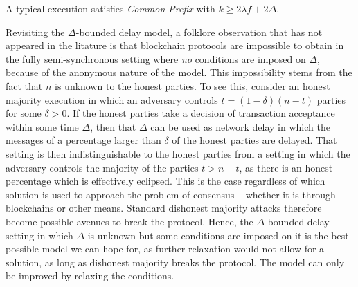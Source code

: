 \begin{theorem}
  A typical execution satisfies \emph{Common Prefix} with
  $k \geq 2\lambda f + 2\Delta$.
\end{theorem}

\begin{remark}
Revisiting the $\Delta$-bounded delay model, a folklore observation that has not appeared in
the litature is that blockchain protocols are impossible to obtain in the fully
semi-synchronous setting where \emph{no} conditions are imposed on $\Delta$,
because of the anonymous nature of the model. This impossibility stems from the
fact that $n$ is unknown to the honest parties. To see this, consider an
honest majority execution in which an adversary controls $t = (1 - \delta)(n -
t)$ parties for some $\delta > 0$. If the honest parties take a decision of
transaction acceptance within some time $\Delta$, then that $\Delta$ can be used
as network delay in which the messages of a percentage larger than $\delta$ of
the honest parties are delayed. That setting is then indistinguishable to the
honest parties from a setting in which the adversary controls the majority of
the parties $t > n - t$, as there is an honest percentage which is effectively
eclipsed. This is the case regardless of which solution is used to approach the
problem of consensus -- whether it is through blockchains or other means.
Standard dishonest majority attacks therefore become possible avenues to break
the protocol. Hence, the $\Delta$-bounded delay setting in which $\Delta$ is
unknown but some conditions are imposed on it is the best possible model we can
hope for, as further relaxation would not allow for a solution, as long as
dishonest majority breaks the protocol. The model can only be improved by
relaxing the conditions.
\end{remark}

